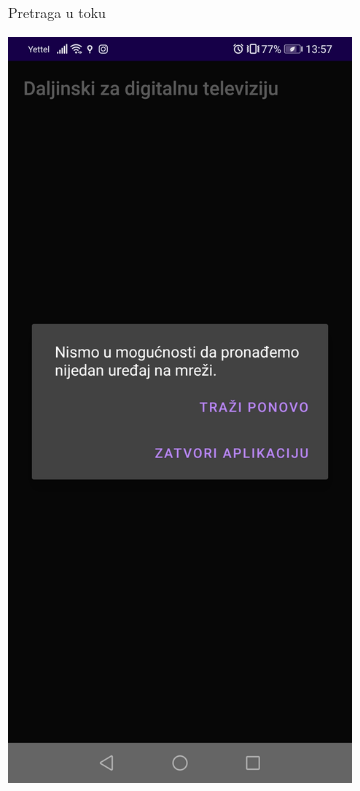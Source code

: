 \documentclass[implementacija.tex]{subfiles}
\begin{document}
\begin{figure}
\begin{subfigure}[b]{0.3\textwidth}
         \caption{Pretraga u toku}
        \label{fig:pretraga}
    \end{subfigure}
    \hfill
    \begin{subfigure}[b]{0.3\textwidth}
        \centering
        \includegraphics[width=\textwidth,keepaspectratio]{Implementacija/snimci_ekrana/4_uredjaji_nisu_pronadjeni.jpg}

\end{subfigure}
\end{figure}
\end{document}
